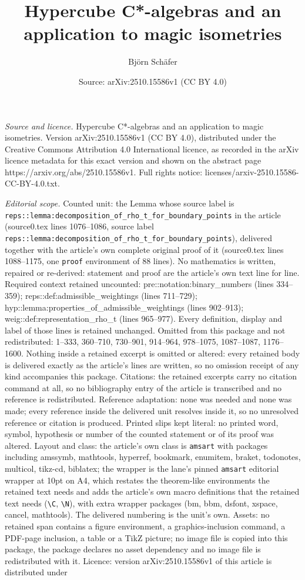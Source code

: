 \documentclass[10pt,a4paper]{amsart}
\title[Hypercube C*-algebras and an application to magic isometries]{Hypercube C*-algebras and an application to magic isometries}
\author{Bj\"orn Sch\"afer}
\date{Source: arXiv:2510.15586v1 (CC BY 4.0)}
\begin{document}
\maketitle

\noindent\emph{Source and licence.} Hypercube C*-algebras and an application to magic isometries. Version arXiv:2510.15586v1 (CC BY 4.0), distributed under the Creative Commons Attribution 4.0 International licence, as recorded in the arXiv licence metadata for this exact version and shown on the abstract page https://arxiv.org/abs/2510.15586v1. Full rights notice: licenses/arxiv-2510.15586-CC-BY-4.0.txt.\par\smallskip

\noindent\textit{Editorial scope.} Counted unit: the Lemma whose source label is \texttt{reps::lemma:decomposition\_of\_rho\_t\_for\_boundary\_points} in the article (source0.tex lines 1076--1086, source label \texttt{reps::lemma:decomposition\_of\_rho\_t\_for\_boundary\_points}), delivered together with the article's own complete original proof of it (source0.tex lines 1088--1175, one \texttt{proof} environment of 88 lines). No mathematics is written, repaired or re-derived: statement and proof are the article's own text line for line. Required context retained uncounted: pre::notation:binary\_numbers (lines 334--359); reps::def:admissible\_weightings (lines 711--729); hyp::lemma:properties\_of\_admissible\_weightings (lines 902--913); weig::def:representation\_rho\_t (lines 965--977). Every definition, display and label of those lines is retained unchanged. Omitted from this package and not redistributed: 1--333, 360--710, 730--901, 914--964, 978--1075, 1087--1087, 1176--1600. Nothing inside a retained excerpt is omitted or altered: every retained body is delivered exactly as the article's lines are written, so no omission receipt of any kind accompanies this package. Citations: the retained excerpts carry no citation command at all, so no bibliography entry of the article is transcribed and no reference is redistributed. Reference adaptation: none was needed and none was made; every reference inside the delivered unit resolves inside it, so no unresolved reference or citation is produced. Printed slips kept literal: no printed word, symbol, hypothesis or number of the counted statement or of its proof was altered. Layout and class: the article's own class is \texttt{amsart} with packages including amssymb, mathtools, hyperref, bookmark, enumitem, braket, todonotes, multicol, tikz-cd, biblatex; the wrapper is the lane's pinned \texttt{amsart} editorial wrapper at 10pt on A4, which restates the theorem-like environments the retained text needs and adds the article's own macro definitions that the retained text needs (\texttt{\textbackslash C}, \texttt{\textbackslash N}), with extra wrapper packages (bm, bbm, dsfont, xspace, cancel, mathtools). The delivered numbering is the unit's own. Assets: no retained span contains a figure environment, a graphics-inclusion command, a PDF-page inclusion, a table or a TikZ picture; no image file is copied into this package, the package declares no asset dependency and no image file is redistributed with it. Licence: version arXiv:2510.15586v1 of this article is distributed under 
\end{document}
